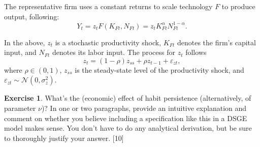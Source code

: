\documentclass[11pt]{article}
\numberwithin{equation}{section} %
\numberwithin{figure}{section} %
\numberwithin{table}{section} %
\theoremstyle{definition}
\newtheorem{exercise}[theorem]{Exercise}
\begin{document}
The representative firm uses a constant returns to scale technology $F$ to produce output, following:
\[
    Y_t = z_t F\left(K_{Ft}, N_{Ft}\right) = z_t K_{Ft}^\alpha N_{Ft}^{1-\alpha}.
\]

In the above, $z_t$ is a stochastic productivity shock, $K_{Ft}$ denotes the firm's capital input, and $N_{Ft}$ denotes its labor input. The process for $z_t$ follows
\[
    z_t =(1-\rho)z_{ss} + \rho z_{t-1} + \varepsilon_{zt},
\]
where $\rho \in (0,1)$, $z_{ss}$ is the steady-state level of the productivity shock, and $\varepsilon_{zt} \sim \mathcal{N}(0,\sigma_{z}^2)$.

\begin{exercise}
    What's the (economic) effect of habit persistence (alternatively, of parameter $\nu$)? In one or two paragraphs, provide an intuitive explanation and comment on whether you believe including a specification like this in a DSGE model makes sense. You don't have to do any analytical derivation, but be sure to thoroughly justify your answer. [10]
\end{exercise}
\end{document}

